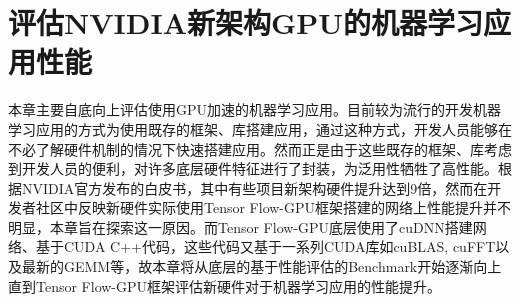 \newpage
\setcounter{table}{0}
\setcounter{figure}{0}
\section{评估NVIDIA新架构GPU的机器学习应用性能}
\par 本章主要自底向上评估使用GPU加速的机器学习应用。目前较为流行的开发机器学习应用的方式为使用既存的框架、库搭建应用，通过这种方式，开发人员能够在不必了解硬件机制的情况下快速搭建应用。然而正是由于这些既存的框架、库考虑到开发人员的便利，对许多底层硬件特征进行了封装，为泛用性牺牲了高性能。根据NVIDIA官方发布的白皮书，其中有些项目新架构硬件提升达到9倍\cite{VOLTAWHITEPAPER}，然而在开发者社区中反映新硬件实际使用Tensor Flow-GPU框架搭建的网络上性能提升并不明显\cite{TFCRESNET}，本章旨在探索这一原因。而Tensor Flow-GPU底层使用了cuDNN搭建网络、基于CUDA C++代码，这些代码又基于一系列CUDA库如cuBLAS, cuFFT以及最新的GEMM等，故本章将从底层的基于性能评估的Benchmark开始逐渐向上直到Tensor Flow-GPU框架评估新硬件对于机器学习应用的性能提升。
